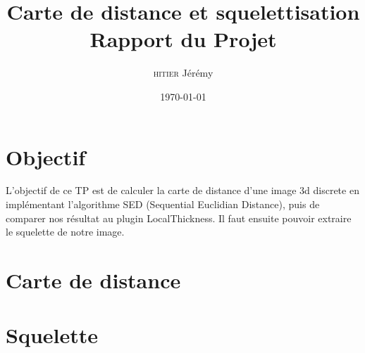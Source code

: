 \documentclass[a4paper,11pt]{report}
\title{Carte de distance et squelettisation \\ Rapport du Projet}
\date{\today}
\author{\textsc{hitier} Jérémy}
\begin{document}
\maketitle
\section*{Objectif}
	L'objectif de ce TP est de calculer la carte de distance d'une image 3d discrete en implémentant l'algorithme SED (Sequential Euclidian Distance), puis de comparer nos résultat au plugin LocalThickness. Il faut ensuite pouvoir extraire le squelette de notre image.

\newpage
\section*{Carte de distance}


\newpage
\section*{Squelette}
	
\end{document}
